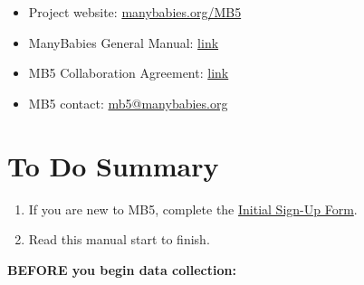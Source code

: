 \documentclass[
]{book}
\providecommand{\tightlist}{%
  \setlength{\itemsep}{0pt}\setlength{\parskip}{0pt}}
\theoremstyle{definition}
\theoremstyle{definition}
\theoremstyle{definition}
\theoremstyle{definition}
\theoremstyle{remark}
\begin{document}
\begin{itemize}
\tightlist
\item
  Project website: \url{manybabies.org/MB5}
\item
  ManyBabies General Manual: \href{https://docs.google.com/document/d/1dZ3sF2UcxvpkfOfKSKFeObTMZRbpUYloMUiPYtZy0ng/edit?usp=sharing}{link}
\item
  MB5 Collaboration Agreement: \href{https://docs.google.com/document/d/1vbTDmH6euda5pJN4uyds3zsnQ1DXrW9wpHogwC-5TSk/edit?usp=sharing}{link}
\item
  MB5 contact: \url{mb5@manybabies.org}
\end{itemize}

\hypertarget{to-do-summary}{%
\section{To Do Summary}\label{to-do-summary}}

\begin{enumerate}
\def\labelenumi{\arabic{enumi}.}
\tightlist
\item
  If you are new to MB5, complete the \href{https://docs.google.com/forms/d/e/1FAIpQLSdJnP3KO_dCmj-jNPHs0XP2j3q66g1RI6L31dwhCzhwhoJeoA/viewform}{Initial Sign-Up Form}.
\item
  Read this manual start to finish.
\end{enumerate}

\textbf{BEFORE you begin data collection:}
\end{document}
